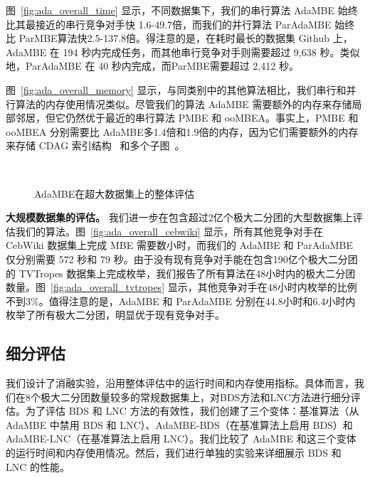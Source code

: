 图~\ref{fig:ada_overall_time} 显示，不同数据集下，我们的串行算法 AdaMBE 始终比其最接近的串行竞争对手快 1.6-49.7倍，而我们的并行算法 ParAdaMBE 始终比 ParMBE算法快2.5-137.8倍。得注意的是，在耗时最长的数据集 Github 上，AdaMBE 在 194 秒内完成任务，而其他串行竞争对手则需要超过 9,638 秒。类似地，ParAdaMBE 在 40 秒内完成，而ParMBE需要超过 2,412 秒。

图~\ref{fig:ada_overall_memory} 显示，与同类别中的其他算法相比，我们串行和并行算法的内存使用情况类似。尽管我们的算法 AdaMBE 需要额外的内存来存储局部邻居，但它仍然优于最近的串行算法 PMBE 和 ooMBEA。事实上，PMBE 和 ooMBEA 分别需要比 AdaMBE多1.4倍和1.9倍的内存，因为它们需要额外的内存来存储 CDAG 索引结构~\cite{PMBE20} 和多个子图~\cite{ooMBE22}。


\begin{figure} [H]
  \centering
	\\

  \caption{AdaMBE在超大数据集上的整体评估}
  \label{fig:ada_overall_large}
\end{figure}


\textbf{大规模数据集的评估。} 我们进一步在包含超过2亿个极大二分团的大型数据集上评估我们的算法。图~\ref{fig:ada_overall_cebwiki} 显示，所有其他竞争对手在 CebWiki 数据集上完成 MBE 需要数小时，而我们的 AdaMBE 和 ParAdaMBE 仅分别需要 572 秒和 79 秒。由于没有现有竞争对手能在包含190亿个极大二分团的 TVTropes 数据集上完成枚举，我们报告了所有算法在48小时内的极大二分团数量。图~\ref{fig:ada_overall_tvtropes} 显示，其他竞争对手在48小时内枚举的比例不到3\%。值得注意的是，AdaMBE 和 ParAdaMBE 分别在44.8小时和6.4小时内枚举了所有极大二分团，明显优于现有竞争对手。


\subsection{细分评估}

我们设计了消融实验，沿用整体评估中的运行时间和内存使用指标。具体而言，我们在8个极大二分团数量较多的常规数据集上，对BDS方法和LNC方法进行细分评估。为了评估 BDS 和 LNC 方法的有效性，我们创建了三个变体：基准算法（从 AdaMBE 中禁用 BDS 和 LNC）、AdaMBE-BDS（在基准算法上启用 BDS）和 AdaMBE-LNC（在基准算法上启用 LNC）。我们比较了 AdaMBE 和这三个变体的运行时间和内存使用情况。然后，我们进行单独的实验来详细展示 BDS 和 LNC 的性能。

